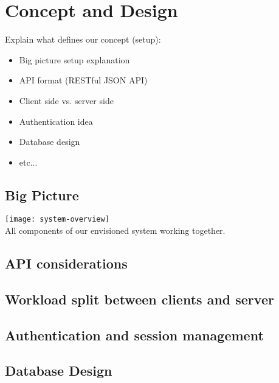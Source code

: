\chapter{Concept and Design}
\label{cha:conceptanddesign}

Explain what defines our concept (setup):
\begin{itemize}
    \item Big picture setup explanation
    \item API format (RESTful JSON API)
    \item Client side vs. server side
    \item Authentication idea
    \item Database design
    \item etc...
\end{itemize}


\vspace{0.5cm}

\section{Big Picture}

\begin{center}
    \texttt{[image: system-overview]}\\
    All components of our envisioned system working together.
\end{center}


\vspace{0.5cm}

\section{API considerations}


\vspace{0.5cm}

\section{Workload split between clients and server}


\vspace{0.5cm}

\section{Authentication and session management}


\vspace{0.5cm}

\section{Database Design}
